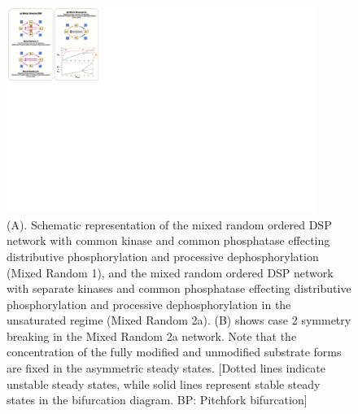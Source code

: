 \documentclass[9pt,lineno]{elife}
\begin{document}

\newpage

\begin{figure}[ht!]
    \centering
    \includegraphics[width = 0.9\textwidth, keepaspectratio]{FigS01.pdf}
    \caption{(A). Schematic representation of the mixed random ordered DSP network with common kinase and common phosphatase effecting distributive  phosphorylation and processive dephosphorylation (Mixed Random 1), and the mixed random ordered DSP network with separate kinases and common phosphatase effecting distributive phosphorylation and processive dephosphorylation in the unsaturated regime (Mixed Random 2a). (B) shows case 2 symmetry breaking in the Mixed Random 2a network. Note that the concentration of the fully modified and unmodified substrate forms are fixed in the asymmetric steady states.
    [Dotted lines indicate unstable steady states, while solid lines represent stable steady states in the bifurcation diagram. BP: Pitchfork bifurcation]}
    \label{Fig S1}
\end{figure}
\end{document}
